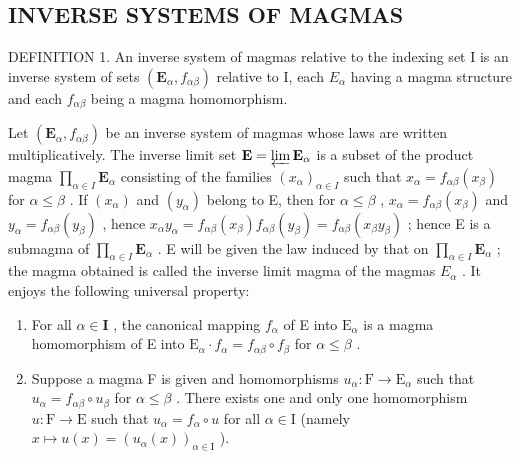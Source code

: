 \subsection{INVERSE SYSTEMS OF MAGMAS}

DEFINITION 1. An inverse system of magmas relative to the indexing set I is an inverse system of sets \((\mathbf{E}_{\alpha}, f_{\alpha\beta})\) relative to I, each \(E_{\alpha}\) having a magma structure and each \(f_{\alpha\beta}\) being a magma homomorphism.

Let \((\mathbf{E}_{\alpha}, f_{\alpha \beta})\) be an inverse system of magmas whose laws are written multiplicatively. The inverse limit set \(\mathbf{E} = \varprojlim \mathbf{E}_{\alpha}\) is a subset of the product magma \(\prod_{\alpha \in I} \mathbf{E}_{\alpha}\) consisting of the families \((x_{\alpha})_{\alpha \in I}\) such that \(x_{\alpha} = f_{\alpha \beta}(x_{\beta})\) for \(\alpha \leqslant \beta\) . If \((x_{\alpha})\) and \((y_{\alpha})\) belong to E, then for \(\alpha \leqslant \beta\) , \(x_{\alpha} = f_{\alpha \beta}(x_{\beta})\) and \(y_{\alpha} = f_{\alpha \beta}(y_{\beta})\) , hence \(x_{\alpha}y_{\alpha} = f_{\alpha \beta}(x_{\beta})f_{\alpha \beta}(y_{\beta}) = f_{\alpha \beta}(x_{\beta}y_{\beta})\) ; hence E is a submagma of \(\prod_{\alpha \in I} \mathbf{E}_{\alpha}\) . E will be given the law induced by that on \(\prod_{\alpha \in I} \mathbf{E}_{\alpha}\) ; the magma obtained is called the inverse limit magma of the magmas \(E_{\alpha}\) . It enjoys the following universal property:

\begin{enumerate}
\def\labelenumi{(\alph{enumi})}
\item
  For all \(\alpha \in \mathbf{I}\) , the canonical mapping \(f_{\alpha}\) of E into \(\mathrm{E}_{\alpha}\) is a magma homomorphism of E into \(\mathrm{E}_{\alpha} \cdot f_{\alpha} = f_{\alpha \beta} \circ f_{\beta}\) for \(\alpha \leqslant \beta\) .
\item
  Suppose a magma F is given and homomorphisms \(u_{\alpha} \colon \mathrm{F} \to \mathrm{E}_{\alpha}\) such that \(u_{\alpha} = f_{\alpha \beta} \circ u_{\beta}\) for \(\alpha \leqslant \beta\) . There exists one and only one homomorphism \(u \colon \mathrm{F} \to \mathrm{E}\) such that \(u_{\alpha} = f_{\alpha} \circ u\) for all \(\alpha \in \mathrm{I}\) (namely \(x \mapsto u(x) = (u_{\alpha}(x))_{\alpha \in \mathrm{I}}\) ).
\end{enumerate}

